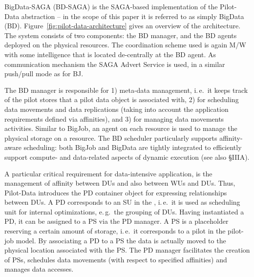 BigData-SAGA (BD-SAGA) is the SAGA-based implementation of the
Pilot-Data abstraction -- in the scope of this paper it is referred to
as simply BigData (BD).  Figure~\ref{fig:pilot-data-architecture}
gives an overview of the architecture.  The system consists of two
components: the BD manager, and the BD agents deployed on the physical
resources. The coordination scheme used is again M/W with some
intelligence that is located de-centrally at the BD agent. As
communication mechanism the SAGA Advert Service is used, in a similar
push/pull mode as for BJ.

The BD manager is responsible for 1) meta-data management, i.\,e.\ it
keeps track of the pilot stores that a pilot data object is associated
with, 2) for scheduling data movements and data replications (taking
into account the application requirements defined via affinities), and
3) for managing data movements activities.  Similar to BigJob, an
agent on each resource is used to manage the physical storage on a
resource.  The BD scheduler particularly supports affinity-aware
scheduling: both BigJob and BigData are tightly integrated to
efficiently support compute- and data-related aspects of dynamic
execution (see also \S{IIIA}).

A particular critical requirement for data-intensive application, is
the management of affinity between DUs and also between WUs and
DUs. Thus, Pilot-Data introduces the PD container object for
expressing relationships between DUs. A PD corresponds to an SU in the
, i.\,e.\ it is used as scheduling unit for internal
optimizations, e.\,g.\ the grouping of DUs. Having instantiated a PD,
it can be assigned to a PS via the PD manager. A PS is a placeholder
reserving a certain amount of storage, i.\,e.\ it corresponds to a
pilot in the pilot-job model. By associating a PD to a PS the data is
actually moved to the physical location associated with the PS. The PD
manager facilitates the creation of PSs, schedules data movements
(with respect to specified affinities) and manages data accesses.




